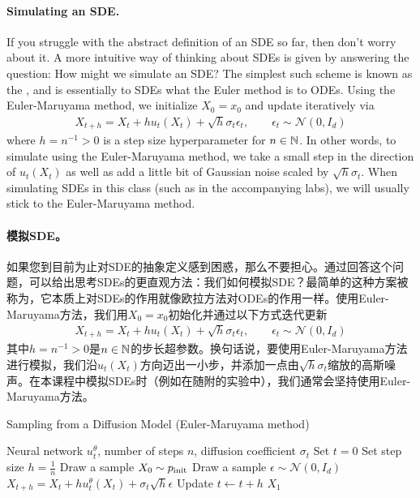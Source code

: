 \paragraph{Simulating an SDE.} If you struggle with the abstract definition of an SDE so far, then don't worry about it. A more intuitive way of thinking about SDEs is given by answering the question: How might we simulate an SDE? The simplest such scheme is known as the , and is essentially to SDEs what the Euler method is to ODEs. Using the Euler-Maruyama method, we initialize $X_0=x_0$ and update iteratively via
\begin{align}
\label{e:euler_method_sdes}
    X_{t+h} = X_{t}+hu_t(X_t) + \sqrt{h}\sigma_t\epsilon_t,\quad \quad \epsilon_t \sim \mathcal{N}(0,I_d)
\end{align}
where $h=n^{-1}>0$ is a step size hyperparameter for $n \in \mathbb N$. In other words, to simulate using the Euler-Maruyama method, we take a small step in the direction of $u_t(X_t)$ as well as add a little bit of Gaussian noise scaled by $\sqrt{h}\sigma_t$. When simulating SDEs in this class (such as in the accompanying labs), we will usually stick to the Euler-Maruyama method.

\paragraph{模拟SDE。} 如果您到目前为止对SDE的抽象定义感到困惑，那么不要担心。通过回答这个问题，可以给出思考SDEs的更直观方法：我们如何模拟SDE？最简单的这种方案被称为，它本质上对SDEs的作用就像欧拉方法对ODEs的作用一样。使用Euler-Maruyama方法，我们用$X_0=x_0$初始化并通过以下方式迭代更新
\begin{align}
    X_{t+h} = X_{t}+hu_t(X_t) + \sqrt{h}\sigma_t\epsilon_t,\quad \quad \epsilon_t \sim \mathcal{N}(0,I_d)
\end{align}
其中$h=n^{-1}>0$是$n \in \mathbb N$的步长超参数。换句话说，要使用Euler-Maruyama方法进行模拟，我们沿$u_t(X_t)$方向迈出一小步，并添加一点由$\sqrt{h}\sigma_t$缩放的高斯噪声。在本课程中模拟SDEs时（例如在随附的实验中），我们通常会坚持使用Euler-Maruyama方法。

\begin{algorithm}[h]
\caption{Sampling from a Diffusion Model (Euler-Maruyama  method)}
\label{alg:sampling_diffusion_model}
\begin{algorithmic}[1]
\REQUIRE Neural network $u_t^\theta$, number of steps $n$, diffusion coefficient $\sigma_t$
\STATE Set $t=0$
\STATE Set step size $h=\frac{1}{n}$
\STATE Draw a sample $X_0\sim p_{\rm{init}}$
    \STATE Draw a sample $\epsilon\sim \mathcal{N}(0,I_d)$
    \STATE $X_{t+h} = X_{t} + h u_t^\theta(X_t)+\sigma_t\sqrt{h}\epsilon$
    \STATE Update $t\leftarrow t+h$
\ENDFOR
\RETURN $X_1$
\end{algorithmic}
\end{algorithm}

